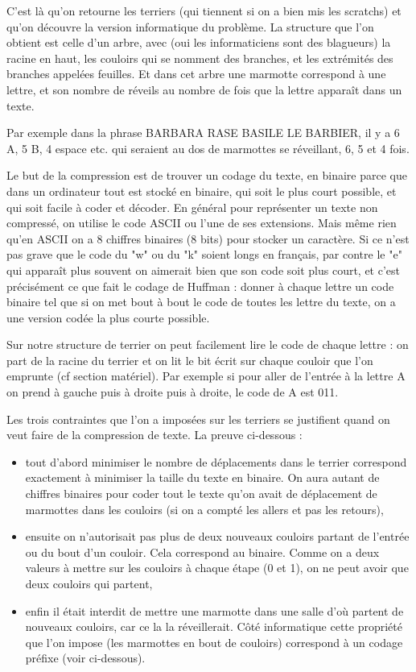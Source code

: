 \documentclass[a4paper,10pt]{article}
\begin{document}
C'est là qu'on retourne les terriers (qui tiennent si on a bien mis
les scratchs) et qu'on découvre la version informatique du
problème. La structure que l'on obtient est celle d'un arbre, avec
(oui les informaticiens sont des blagueurs) la racine en haut, les
couloirs qui se nomment des branches, et les extrémités des branches
appelées feuilles. Et dans cet arbre une marmotte correspond à une lettre, et son nombre de
réveils au nombre de fois que la lettre apparaît dans un texte. 

Par exemple dans la phrase BARBARA RASE BASILE LE BARBIER, il y a 6 A,
5 B, 4 espace etc. qui seraient au dos de marmottes se réveillant, 6,
5 et 4 fois. 

Le but de la compression est de trouver un codage du texte, en binaire parce
que dans un ordinateur tout est stocké en binaire, qui soit le plus
court possible, et qui soit facile à coder et décoder. En général pour
représenter un texte non compressé, on utilise le code ASCII ou l'une
de ses extensions. Mais même rien qu'en ASCII on a 8 chiffres binaires
(8 bits) pour stocker un caractère. Si ce n'est pas grave que le code
du "w" ou du "k" soient longs en français, par contre le "e" qui
apparaît plus souvent on aimerait bien que son code soit plus court,
et c'est précisément ce que fait le codage de Huffman : donner à
chaque lettre un code binaire tel que si on met bout à bout le code de
toutes les lettre du texte, on a une version codée la plus courte possible.

Sur notre structure de terrier on peut facilement lire le code de
chaque lettre : on part de la racine du terrier et on lit le bit écrit
sur chaque couloir que l'on emprunte (cf section matériel). Par
exemple si pour aller de l'entrée à la lettre A on prend à gauche
puis à droite puis à droite, le code de A est 011.

Les trois contraintes que l'on a imposées sur les terriers se justifient quand on veut
faire de la compression de texte. La preuve ci-dessous : 

\begin{itemize}
\item tout d'abord minimiser le nombre de déplacements dans le terrier
  correspond exactement à minimiser la taille du texte en binaire. On
  aura autant de chiffres binaires pour coder tout le texte qu'on
  avait de déplacement de marmottes dans les couloirs (si on a compté
  les allers et pas les retours),
\item ensuite on n'autorisait pas plus de deux nouveaux couloirs partant de
  l'entrée ou du bout d'un couloir. Cela correspond au binaire. Comme
  on a deux valeurs à mettre sur les couloirs à chaque étape (0 et 1),
  on ne peut avoir que deux couloirs qui partent,
\item enfin il était interdit de mettre une marmotte dans une salle
  d'où partent de nouveaux couloirs, car ce la la réveillerait. Côté
  informatique cette propriété que l'on impose (les marmottes en bout
  de couloirs) correspond à un codage préfixe (voir ci-dessous).
\end{itemize}
\end{document}
